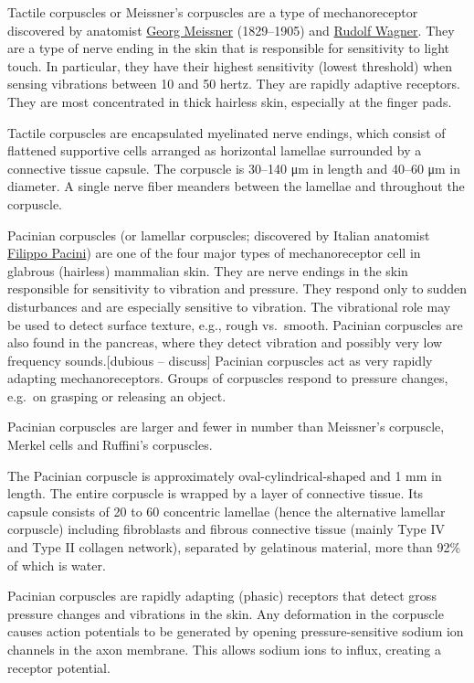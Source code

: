 Tactile corpuscles or Meissner's corpuscles are a type of mechanoreceptor discovered by anatomist \href{https://en.wikipedia.org/wiki/Georg_Meissner}{Georg Meissner} (1829--1905) and \href{https://en.wikipedia.org/wiki/Rudolf_Wagner}{Rudolf Wagner}. They are a type of nerve ending in the skin that is responsible for sensitivity to light touch. In particular, they have their highest sensitivity (lowest threshold) when sensing vibrations between 10 and 50 hertz. They are rapidly adaptive receptors. They are most concentrated in thick hairless skin, especially at the finger pads.

Tactile corpuscles are encapsulated myelinated nerve endings, which consist of flattened supportive cells arranged as horizontal lamellae surrounded by a connective tissue capsule. The corpuscle is 30--140 μm in length and 40--60 μm in diameter. A single nerve fiber meanders between the lamellae and throughout the corpuscle.

Pacinian corpuscles (or lamellar corpuscles; discovered by Italian anatomist \href{https://en.wikipedia.org/wiki/Filippo_Pacini}{Filippo Pacini}) are one of the four major types of mechanoreceptor cell in glabrous (hairless) mammalian skin. They are nerve endings in the skin responsible for sensitivity to vibration and pressure. They respond only to sudden disturbances and are especially sensitive to vibration. The vibrational role may be used to detect surface texture, e.g., rough vs.~smooth. Pacinian corpuscles are also found in the pancreas, where they detect vibration and possibly very low frequency sounds.{[}dubious -- discuss{]} Pacinian corpuscles act as very rapidly adapting mechanoreceptors. Groups of corpuscles respond to pressure changes, e.g.~on grasping or releasing an object.

Pacinian corpuscles are larger and fewer in number than Meissner's corpuscle, Merkel cells and Ruffini's corpuscles.

The Pacinian corpuscle is approximately oval-cylindrical-shaped and 1 mm in length. The entire corpuscle is wrapped by a layer of connective tissue. Its capsule consists of 20 to 60 concentric lamellae (hence the alternative lamellar corpuscle) including fibroblasts and fibrous connective tissue (mainly Type IV and Type II collagen network), separated by gelatinous material, more than 92\% of which is water.

Pacinian corpuscles are rapidly adapting (phasic) receptors that detect gross pressure changes and vibrations in the skin. Any deformation in the corpuscle causes action potentials to be generated by opening pressure-sensitive sodium ion channels in the axon membrane. This allows sodium ions to influx, creating a receptor potential.

